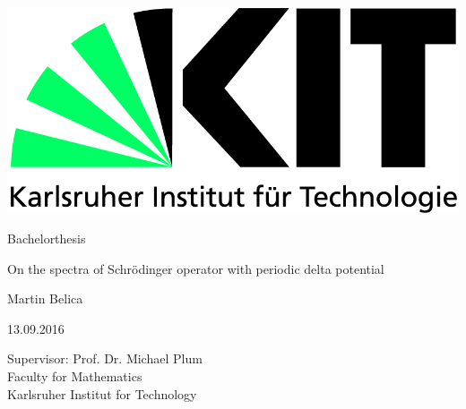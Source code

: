 \begin{titlepage}

    \includegraphics[scale=0.45,left]{kit-logo.jpg} 
    \vspace*{2.5cm} 

 \begin{center} \Large 
    
    Bachelorthesis
    \vspace*{3cm}

    {\Huge On the spectra of Schrödinger operator with periodic delta potential}
    \vspace*{3.5cm}

    Martin Belica
    \vspace*{2.5cm}

    13.09.2016
    \vspace*{5cm}


    Supervisor: Prof. Dr. Michael Plum \\[0.9cm]
    Faculty for Mathematics \\[0.9cm]
		Karlsruher Institut for Technology
  \end{center}
  \vspace{2cm}
\end{titlepage}